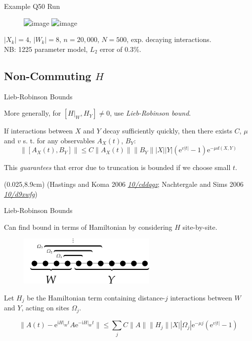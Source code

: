 \documentclass[xcolor=dvipsnames, compress]{beamer}
\renewcommand\UrlFont{\color{red}\rmfamily\itshape}
\newcommand{\shortdoi}[1]{\href{http://doi.org/#1}{\UrlFont 10/#1}}
\newcommand{\ee}{\mathrm{e}}
\newcommand{\ii}{\mathrm{i}}
\newcommand{\bottomnote}[1]{
  \begin{textblock*}{0.95\paperwidth} (0.025\paperwidth,8.9cm)
    {\tiny \hfill #1}
  \end{textblock*}
}
\begin{document}
\begin{frame}{Example Q50 Run}

  \begin{figure}
    \centering
    \includegraphics<1>[width=1\textwidth]{figures/8outc2a-hist}
    \includegraphics<2>[width=0.5\textwidth]{figures/q50-comparison}
  \end{figure}

  $|X_k| = 4$, $|W_k| = 8$, $n = 20,000$, $N = 500$, exp. decaying interactions.\\
  NB: 1225 parameter model, $L_2$ error of $0.3\%$.

\end{frame}

\subsection{Non-Commuting $H$}

\begin{frame}{Lieb-Robinson Bounds}

  More generally, for $[H|_W, H_Y] \ne 0$, use \emph{Lieb-Robinson bound}.

  If interactions between $X$ and $Y$ decay sufficiently quickly,
  then there exists $C$, $\mu$ and $v$ s. t. for any observables $A_X(t)$, $B_Y$:
  $$
    \|[A_X(t), B_Y]\| \le C \|A_X(t)\| \|B_Y\| |X| |Y| (\ee^{v|t|} - 1) \ee^{-\mu d(X, Y)}
  $$

  This \emph{guarantees} that error due to truncation is bounded if
  we choose small $t$.

  \bottomnote{(Hastings and Koma 2006 \shortdoi{cddqgz}; Nachtergale and Sims 2006 \shortdoi{d9xwfg})}

\end{frame}

\begin{frame}{Lieb-Robinson Bounds}

  Can find bound in terms of Hamiltonian by considering $H$ site-by-site.

  \begin{figure}
    \centering
    \includegraphics[width=0.6\textwidth]{figures/bootstrapping-partition-distance}
  \end{figure}

  Let $H_j$ be the Hamiltonian term containing distance-$j$
  interactions between $W$ and $Y$, acting on sites $\Omega_j$.

  $$
    \|A(t) - \ee^{\ii H|_W t} A \ee^{-\ii H|_W t} \| \le
    \sum_{j} C \|A\| \|H_j\| |X| |\Omega_j| \ee^{-\mu j} (\ee^{v |t|} - 1)
  $$

\end{frame}
\end{document}
